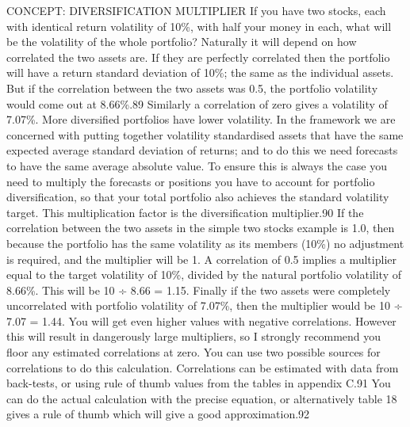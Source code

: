 \begin{englishblock} CONCEPT: DIVERSIFICATION MULTIPLIER If you have two stocks, each with identical return volatility of 10\%, with half your money in each, what will be the volatility of the whole portfolio? Naturally it will depend on how correlated the two assets are. If they are perfectly correlated then the portfolio will have a return standard deviation of 10\%; the same as the individual assets. But if the correlation between the two assets was 0.5, the portfolio volatility would come out at 8.66\%.89 Similarly a correlation of zero gives a volatility of 7.07\%. More diversified portfolios have lower volatility. In the framework we are concerned with putting together volatility standardised assets that have the same expected average standard deviation of returns; and to do this we need forecasts to have the same average absolute value. To ensure this is always the case you need to multiply the forecasts or positions you have to account for portfolio diversification, so that your total portfolio also achieves the standard volatility target. This multiplication factor is the diversification multiplier.90 If the correlation between the two assets in the simple two stocks example is 1.0, then because the portfolio has the same volatility as its members (10\%) no adjustment is required, and the multiplier will be 1. A correlation of 0.5 implies a multiplier equal to the target volatility of 10\%, divided by the natural portfolio volatility of 8.66\%. This will be 10 ÷ 8.66 = 1.15. Finally if the two assets were completely uncorrelated with portfolio volatility of 7.07\%, then the multiplier would be 10 ÷ 7.07 = 1.44. You will get even higher values with negative correlations. However this will result in dangerously large multipliers, so I strongly recommend you floor any estimated correlations at zero. You can use two possible sources for correlations to do this calculation. Correlations can be estimated with data from back-tests, or using rule of thumb values from the tables in appendix C.91 You can do the actual calculation with the precise equation, or alternatively table 18 gives a rule of thumb which will give a good approximation.92 \end{englishblock}

